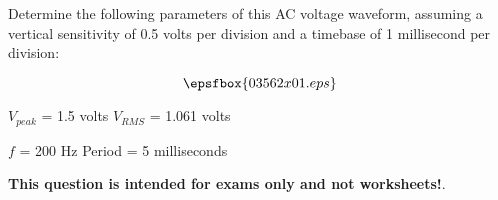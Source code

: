 

Determine the following parameters of this AC voltage waveform, assuming a vertical sensitivity of 0.5 volts per division and a timebase of 1 millisecond per division:

$$\epsfbox{03562x01.eps}$$







$V_{peak}$ = 1.5 volts \hskip 100pt $V_{RMS}$ = 1.061 volts

\vskip 10pt

$f$ = 200 Hz \hskip 100pt Period = 5 milliseconds







{\bf This question is intended for exams only and not worksheets!}.



